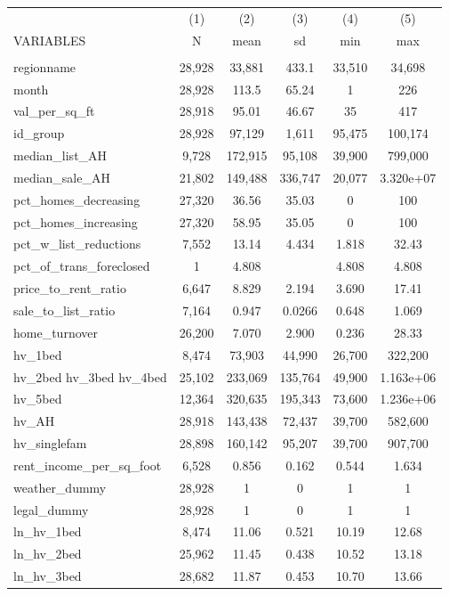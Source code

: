 \begin{tabular}{lccccc} \hline
 & (1) & (2) & (3) & (4) & (5) \\
VARIABLES & N & mean & sd & min & max \\ \hline
 &  &  &  &  &  \\
regionname & 28,928 & 33,881 & 433.1 & 33,510 & 34,698 \\
month & 28,928 & 113.5 & 65.24 & 1 & 226 \\
val\_per\_sq\_ft & 28,918 & 95.01 & 46.67 & 35 & 417 \\
id\_group & 28,928 & 97,129 & 1,611 & 95,475 & 100,174 \\
median\_list\_AH & 9,728 & 172,915 & 95,108 & 39,900 & 799,000 \\
median\_sale\_AH & 21,802 & 149,488 & 336,747 & 20,077 & 3.320e+07 \\
pct\_homes\_decreasing & 27,320 & 36.56 & 35.03 & 0 & 100 \\
pct\_homes\_increasing & 27,320 & 58.95 & 35.05 & 0 & 100 \\
pct\_w\_list\_reductions & 7,552 & 13.14 & 4.434 & 1.818 & 32.43 \\
pct\_of\_trans\_foreclosed & 1 & 4.808 &  & 4.808 & 4.808 \\
price\_to\_rent\_ratio & 6,647 & 8.829 & 2.194 & 3.690 & 17.41 \\
sale\_to\_list\_ratio & 7,164 & 0.947 & 0.0266 & 0.648 & 1.069 \\
home\_turnover & 26,200 & 7.070 & 2.900 & 0.236 & 28.33 \\
hv\_1bed & 8,474 & 73,903 & 44,990 & 26,700 & 322,200 \\
hv\_2bed 
hv\_3bed 
hv\_4bed & 25,102 & 233,069 & 135,764 & 49,900 & 1.163e+06 \\
hv\_5bed & 12,364 & 320,635 & 195,343 & 73,600 & 1.236e+06 \\
hv\_AH & 28,918 & 143,438 & 72,437 & 39,700 & 582,600 \\
hv\_singlefam & 28,898 & 160,142 & 95,207 & 39,700 & 907,700 \\
rent\_income\_per\_sq\_foot & 6,528 & 0.856 & 0.162 & 0.544 & 1.634 \\
weather\_dummy & 28,928 & 1 & 0 & 1 & 1 \\
legal\_dummy & 28,928 & 1 & 0 & 1 & 1 \\
ln\_hv\_1bed & 8,474 & 11.06 & 0.521 & 10.19 & 12.68 \\
ln\_hv\_2bed & 25,962 & 11.45 & 0.438 & 10.52 & 13.18 \\
ln\_hv\_3bed & 28,682 & 11.87 & 0.453 & 10.70 & 13.66 \\

\end{tabular}
